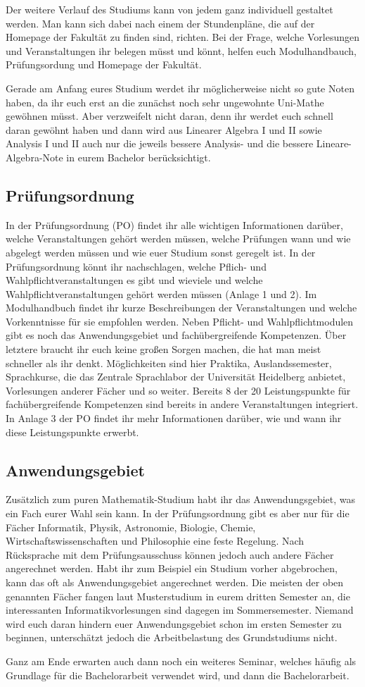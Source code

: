 Der weitere Verlauf des Studiums kann von jedem ganz individuell gestaltet
werden.  Man kann sich dabei nach einem der Stundenpläne, die auf der Homepage
der Fakultät zu finden sind, richten. Bei der Frage, welche Vorlesungen und
Veranstaltungen ihr belegen müsst und könnt, helfen euch Modulhandbauch,
Prüfungsordung und Homepage der Fakultät.

Gerade am Anfang eures Studium werdet ihr möglicherweise nicht so gute Noten
haben, da ihr euch erst an die zunächst noch sehr ungewohnte Uni-Mathe gewöhnen
müsst. Aber verzweifelt nicht daran, denn ihr werdet euch schnell daran gewöhnt
haben und dann wird aus Linearer Algebra I und II sowie Analysis I und II  auch
nur die jeweils bessere Analysis- und die bessere Lineare-Algebra-Note in eurem
Bachelor berücksichtigt.

\subsection{Prüfungsordnung}

In der Prüfungsordnung (PO) findet ihr alle wichtigen Informationen darüber,
welche Veranstaltungen gehört werden müssen, welche Prüfungen wann und wie
abgelegt werden müssen und wie euer Studium sonst geregelt ist.  In der
Prüfungsordnung könnt ihr nachschlagen, welche Pflich- und
Wahlpflichtveranstaltungen es gibt und wieviele und welche
Wahlpflichtveranstaltungen gehört werden müssen (Anlage 1 und 2).  Im
Modulhandbuch findet ihr kurze Beschreibungen der Veranstaltungen und welche
Vorkenntnisse für sie empfohlen werden.  Neben Pflicht- und Wahlpflichtmodulen
gibt es noch das Anwendungsgebiet und fachübergreifende Kompetenzen.  Über
letztere braucht ihr euch keine großen Sorgen machen, die hat man meist
schneller als ihr denkt. Möglichkeiten sind hier Praktika, Auslandssemester,
Sprachkurse, die das Zentrale Sprachlabor der Universität Heidelberg anbietet,
Vorlesungen anderer Fächer und so weiter.  Bereits 8 der 20 Leistungspunkte für
fachübergreifende Kompetenzen sind bereits in andere Veranstaltungen
integriert.  In Anlage 3 der PO findet ihr mehr Informationen darüber, wie und
wann ihr diese Leistungspunkte erwerbt.


\subsection{Anwendungsgebiet}

Zusätzlich zum puren Mathematik-Studium habt ihr das Anwendungsgebiet, was ein
Fach eurer Wahl sein kann.  In der Prüfungsordnung gibt es aber nur für die
Fächer Informatik, Physik, Astronomie, Biologie, Chemie,
Wirtschaftswissenschaften und Philosophie eine feste Regelung. Nach Rücksprache
mit dem Prüfungsausschuss können jedoch auch andere Fächer angerechnet werden.
Habt ihr zum Beispiel ein Studium vorher abgebrochen, kann das oft als
Anwendungsgebiet angerechnet werden.  Die meisten der oben genannten Fächer
fangen laut Musterstudium in eurem dritten Semester an, die interessanten
Informatikvorlesungen sind dagegen im Sommersemester.  Niemand wird euch daran
hindern euer Anwendungsgebiet schon im ersten Semester zu beginnen,
unterschätzt jedoch die Arbeitbelastung des Grundstudiums nicht.

Ganz am Ende erwarten auch dann noch ein weiteres Seminar, welches häufig als
Grundlage für die Bachelorarbeit verwendet wird, und dann die Bachelorarbeit.
